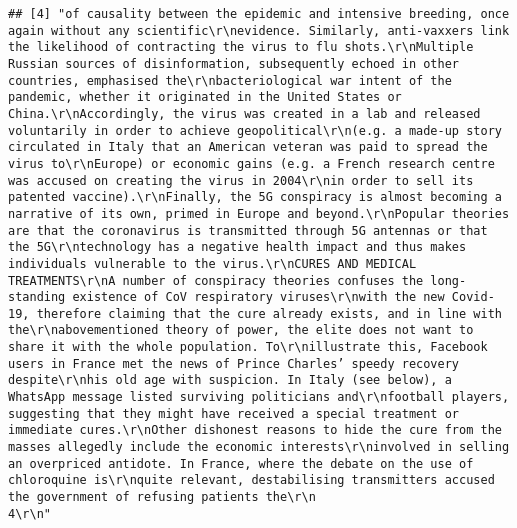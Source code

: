 \documentclass[
]{book}
\begin{document}
\begin{verbatim}
## [4] "of causality between the epidemic and intensive breeding, once again without any scientific\r\nevidence. Similarly, anti-vaxxers link the likelihood of contracting the virus to flu shots.\r\nMultiple Russian sources of disinformation, subsequently echoed in other countries, emphasised the\r\nbacteriological war intent of the pandemic, whether it originated in the United States or China.\r\nAccordingly, the virus was created in a lab and released voluntarily in order to achieve geopolitical\r\n(e.g. a made-up story circulated in Italy that an American veteran was paid to spread the virus to\r\nEurope) or economic gains (e.g. a French research centre was accused on creating the virus in 2004\r\nin order to sell its patented vaccine).\r\nFinally, the 5G conspiracy is almost becoming a narrative of its own, primed in Europe and beyond.\r\nPopular theories are that the coronavirus is transmitted through 5G antennas or that the 5G\r\ntechnology has a negative health impact and thus makes individuals vulnerable to the virus.\r\nCURES AND MEDICAL TREATMENTS\r\nA number of conspiracy theories confuses the long-standing existence of CoV respiratory viruses\r\nwith the new Covid-19, therefore claiming that the cure already exists, and in line with the\r\nabovementioned theory of power, the elite does not want to share it with the whole population. To\r\nillustrate this, Facebook users in France met the news of Prince Charles’ speedy recovery despite\r\nhis old age with suspicion. In Italy (see below), a WhatsApp message listed surviving politicians and\r\nfootball players, suggesting that they might have received a special treatment or immediate cures.\r\nOther dishonest reasons to hide the cure from the masses allegedly include the economic interests\r\ninvolved in selling an overpriced antidote. In France, where the debate on the use of chloroquine is\r\nquite relevant, destabilising transmitters accused the government of refusing patients the\r\n                                                                                                    4\r\n"                                                                                                                                                                                                                                                                                                                                                                                                                                                                                                                                                                                                                                                                                                                                                                                                                                                                                                                                                                                                                                                                                                                                                                                                                                                                                 
\end{verbatim}
\end{document}
